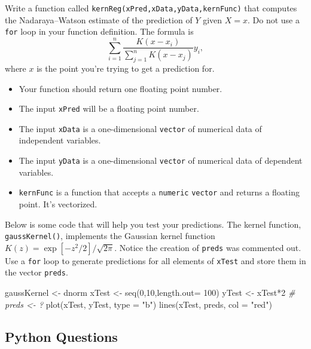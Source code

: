 \documentclass[
  12pt,
  krantz2]{krantz}
\makeatletter
\newenvironment{Shaded}{\begin{snugshade}}{\end{snugshade}}
\newcommand{\AttributeTok}[1]{\textcolor[rgb]{0.61,0.61,0.61}{#1}}
\newcommand{\CommentTok}[1]{\textcolor[rgb]{0.37,0.37,0.37}{\textit{#1}}}
\newcommand{\DecValTok}[1]{\textcolor[rgb]{0.06,0.06,0.06}{#1}}
\newcommand{\FunctionTok}[1]{\textcolor[rgb]{0,0,0}{#1}}
\newcommand{\NormalTok}[1]{#1}
\newcommand{\OtherTok}[1]{\textcolor[rgb]{0.37,0.37,0.37}{#1}}
\newcommand{\SpecialCharTok}[1]{\textcolor[rgb]{0,0,0}{#1}}
\newcommand{\StringTok}[1]{\textcolor[rgb]{0.5,0.5,0.5}{#1}}
\providecommand{\tightlist}{%
  \setlength{\itemsep}{0pt}\setlength{\parskip}{0pt}}
\newenvironment{kframe}{%
\medskip{}
\setlength{\fboxsep}{.8em}
 \def\at@end@of@kframe{}%
 \ifinner\ifhmode%
  \def\at@end@of@kframe{\end{minipage}}%
  \begin{minipage}{\columnwidth}%
 \fi\fi%
 \def\FrameCommand##1{\hskip\@totalleftmargin \hskip-\fboxsep
 \colorbox{shadecolor}{##1}\hskip-\fboxsep
     \hskip-\linewidth \hskip-\@totalleftmargin \hskip\columnwidth}%
 \MakeFramed {\advance\hsize-\width
   \@totalleftmargin\z@ \linewidth\hsize
   \@setminipage}}%
 {\par\unskip\endMakeFramed%
 \at@end@of@kframe}
\renewenvironment{Shaded}{\begin{kframe}}{\end{kframe}}
\makeatother
\begin{document}
Write a function called \texttt{kernReg(xPred,xData,yData,kernFunc)} that computes the Nadaraya--Watson estimate of the prediction of \(Y\) given \(X=x\). Do not use a \texttt{for} loop in your function definition. The formula is
\[\sum_{i=1}^n \frac{K(x-x_i)}{\sum_{j=1}^n K(x-x_j) } y_i,\] where \(x\) is the point you're trying to get a prediction for.

\begin{itemize}
\tightlist
\item
  Your function should return one floating point number.
\item
  The input \texttt{xPred} will be a floating point number.
\item
  The input \texttt{xData} is a one-dimensional \texttt{vector} of numerical data of independent variables.
\item
  The input \texttt{yData} is a one-dimensional \texttt{vector} of numerical data of dependent variables.
\item
  \texttt{kernFunc} is a function that accepts a \texttt{numeric} \texttt{vector} and returns a floating point. It's vectorized.
\end{itemize}

Below is some code that will help you test your predictions. The kernel function, \texttt{gaussKernel()}, implements the Gaussian kernel function \(K(z) = \exp[-z^2/2]/\sqrt{2\pi}\). Notice the creation of \texttt{preds} was commented out. Use a \texttt{for} loop to generate predictions for all elements of \texttt{xTest} and store them in the vector \texttt{preds}.

\begin{Shaded}
\begin{Highlighting}[]
\NormalTok{gaussKernel }\OtherTok{\textless{}{-}}\NormalTok{ dnorm}
\NormalTok{xTest }\OtherTok{\textless{}{-}} \FunctionTok{seq}\NormalTok{(}\DecValTok{0}\NormalTok{,}\DecValTok{10}\NormalTok{,}\AttributeTok{length.out=} \DecValTok{100}\NormalTok{)}
\NormalTok{yTest }\OtherTok{\textless{}{-}}\NormalTok{ xTest}\SpecialCharTok{*}\DecValTok{2} 
\CommentTok{\# preds \textless{}{-} ?}
\FunctionTok{plot}\NormalTok{(xTest, yTest, }\AttributeTok{type =} \StringTok{"b"}\NormalTok{)}
\FunctionTok{lines}\NormalTok{(xTest, preds, }\AttributeTok{col =} \StringTok{"red"}\NormalTok{)}
\end{Highlighting}
\end{Shaded}

\hypertarget{python-questions-8}{%
\subsection{Python Questions}\label{python-questions-8}}
\end{document}
